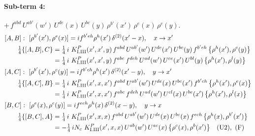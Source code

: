 \documentclass[10pt]{article}
\numberwithin{equation}{section}
\begin{document}
\paragraph{Sub-term 4:} $+\,f^{abd}\,U^{ab'}(w')\,U^{de}(x)\,U^{bc}(y)\,\rho^{b'}(x')\,\rho^{e}(x)\,\rho^{c}(y)$.
\begin{align}
&[A,B]:\ [\rho^{b'}(x'),\rho^{e}(x)]=i f^{b'eh}\rho^{h}(x')\,\delta^{(2)}(x'-x),\quad x\to x'\notag\\
&\qquad \tfrac14\{[A,B],C\}=\tfrac14\,i\,\,K^{P}_{\rm I.III}(x',x',y)\,f^{abd}\,U^{ab'}(w')\,U^{de}(x')\,U^{bc}(y)\,f^{b'eh}\,\big\{\rho^{h}(x'),\rho^{c}(y)\big\}\notag\\
&\qquad\phantom{\tfrac14\{[A,B],C\}}=\tfrac14\,i\,\,K^{P}_{\rm I.III}(x',x',y)\,f^{abc}\,f^{deh}\,U^{ad}(w')\,U^{ce}(x')\,U^{bl}(y)\,\big\{\rho^{h}(x'),\rho^{l}(y)\big\}
\label{B:eq:GI.III.P-4-AB}\\
&[A,C]:\ [\rho^{b'}(x'),\rho^{c}(y)]=i f^{b'ch}\rho^{h}(x')\,\delta^{(2)}(x'-y),\quad y\to x'\notag\\
&\qquad \tfrac14\{[A,C],B\}=\tfrac14\,i\,\,K^{P}_{\rm I.III}(x',x,x')\,f^{abd}\,U^{ab'}(w')\,U^{de}(x)\,U^{bc}(x')\,f^{b'ch}\,\big\{\rho^{h}(x'),\rho^{e}(x)\big\}\notag\\
&\qquad\phantom{\tfrac14\{[A,C],B\}}=\tfrac14\,i\,\,K^{P}_{\rm I.III}(x',x,x')\,f^{abc}\,f^{deh}\,U^{ad}(w')\,U^{cl}(x)\,U^{be}(x')\,\big\{\rho^{h}(x'),\rho^{l}(x)\big\}
\label{B:eq:GI.III.P-4-AC}\\
&[B,C]:\ [\rho^{e}(x),\rho^{c}(y)]=i f^{ech}\rho^{h}(x)\,\delta^{(2)}(x-y),\quad y\to x\notag\\
&\qquad \tfrac14\{[B,C],A\}=\tfrac14\,i\,\,K^{P}_{\rm I.III}(x',x,x)\,f^{abd}\,U^{ab'}(w')\,U^{de}(x)\,U^{bc}(x)\,f^{ech}\,\big\{\rho^{h}(x),\rho^{b'}(x')\big\}\notag\\
&\qquad\phantom{\tfrac14\{[B,C],A\}}=-\tfrac14\,i N_{c}\,\,K^{P}_{\rm I.III}(x',x,x)\,U^{ab}(w')\,U^{ac}(x)\,\big\{\rho^{c}(x),\rho^{b}(x')\big\}\quad\text{(U2)},\ \text{(F)}
\label{B:eq:GI.III.P-4-BC}
\end{align}
\end{document}
